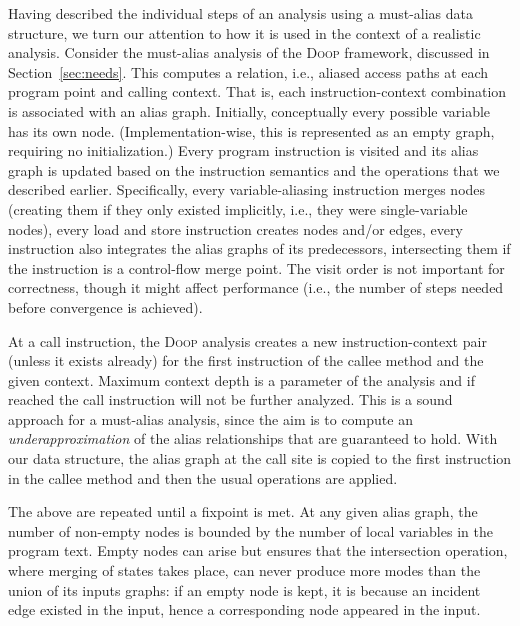 Having described the individual steps of an analysis using a
must-alias data structure, we turn our attention to how it is used in
the context of a realistic analysis. Consider the must-alias analysis
of the \textsc{Doop} framework, discussed in Section~\ref{sec:needs}.
This computes a  relation, i.e.,
aliased access paths at each program point and calling context.
That is, each instruction-context combination is associated with an
alias graph. Initially, conceptually every possible variable has its
own node. (Implementation-wise, this is represented as an empty graph,
requiring no initialization.) Every program instruction is visited and
its alias graph is updated based on the instruction semantics and the
operations that we described earlier. Specifically, every
variable-aliasing instruction merges nodes (creating them if they only
existed implicitly, i.e., they were single-variable nodes), every load
and store instruction creates nodes and/or edges, every instruction
also integrates the alias graphs of its predecessors, intersecting
them if the instruction is a control-flow merge point. The visit order
is not important for correctness, though it might affect performance
(i.e., the number of steps needed before convergence is achieved).

At a call instruction, the \textsc{Doop} analysis creates a new
instruction-context pair (unless it exists already) for the first
instruction of the callee method and the given context. Maximum
context depth is a parameter of the analysis and if reached the call
instruction will not be further analyzed. This is a sound approach for
a must-alias analysis, since the aim is to compute an
\emph{underapproximation} of the alias relationships that are
guaranteed to hold. With our data structure, the alias graph at the
call site is copied to the first instruction in the callee method and
then the usual operations are applied.

The above are repeated until a fixpoint is met. At any given alias
graph, the number of non-empty nodes is bounded by the number of local
variables in the program text. Empty nodes can arise but  ensures
that the intersection operation, where merging of states takes place,
can never produce more modes than the union of its inputs graphs: if
an empty node is kept, it is because an incident edge existed in the
input, hence a corresponding node appeared in the input.



